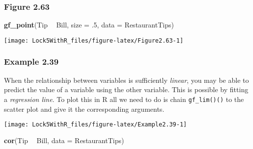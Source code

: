 \documentclass[]{book}
\newenvironment{Shaded}{\begin{snugshade}}{\end{snugshade}}
\newcommand{\DataTypeTok}[1]{\textcolor[rgb]{0.13,0.29,0.53}{#1}}
\newcommand{\FloatTok}[1]{\textcolor[rgb]{0.00,0.00,0.81}{#1}}
\newcommand{\KeywordTok}[1]{\textcolor[rgb]{0.13,0.29,0.53}{\textbf{#1}}}
\newcommand{\NormalTok}[1]{#1}
\newcommand{\OperatorTok}[1]{\textcolor[rgb]{0.81,0.36,0.00}{\textbf{#1}}}
\newcommand{\StringTok}[1]{\textcolor[rgb]{0.31,0.60,0.02}{#1}}
\begin{document}
\hypertarget{figure-2.63}{%
\subsubsection{Figure 2.63}\label{figure-2.63}}

\begin{Shaded}
\begin{Highlighting}[]
\KeywordTok{gf_point}\NormalTok{(Tip }\OperatorTok{~}\StringTok{ }\NormalTok{Bill, }\DataTypeTok{size =} \FloatTok{.5}\NormalTok{, }\DataTypeTok{data =}\NormalTok{ RestaurantTips)}
\end{Highlighting}
\end{Shaded}

\texttt{[image: Lock5WithR\_files/figure-latex/Figure2.63-1]}

\hypertarget{example-2.39}{%
\subsubsection{Example 2.39}\label{example-2.39}}

When the relationship between variables is sufficiently \emph{linear}, you may be able to predict the value of a variable using the other variable. This is possible by fitting a \emph{regression line}. To plot this in R all we need to do is chain \texttt{gf\_lim()()} to the scatter plot and give it the corresponding arguments.

\begin{Shaded}
\end{Shaded}

\texttt{[image: Lock5WithR\_files/figure-latex/Example2.39-1]}

\begin{Shaded}
\begin{Highlighting}[]
\KeywordTok{cor}\NormalTok{(Tip }\OperatorTok{~}\StringTok{ }\NormalTok{Bill, }\DataTypeTok{data =}\NormalTok{ RestaurantTips)}
\end{Highlighting}
\end{Shaded}
\end{document}
